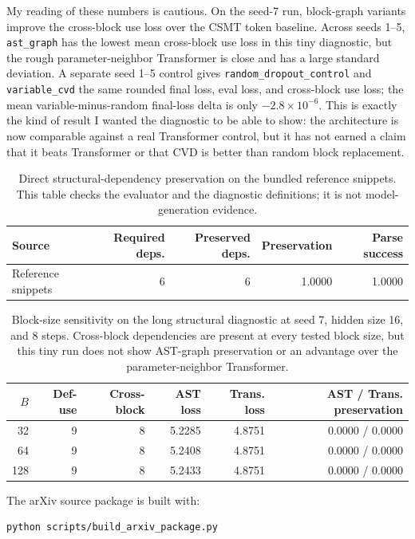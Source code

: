 \documentclass[10pt]{article}
\begin{document}
My reading of these numbers is cautious.  On the seed-7 run, block-graph
variants improve the cross-block use loss over the CSMT token baseline.  Across
seeds 1--5, \texttt{ast\_graph} has the lowest mean cross-block use loss in this
tiny diagnostic, but the rough parameter-neighbor Transformer is close and has a
large standard deviation.  A separate seed 1--5 control gives
\texttt{random\_dropout\_control} and \texttt{variable\_cvd} the same rounded
final loss, eval loss, and cross-block use loss; the mean variable-minus-random
final-loss delta is only $-2.8\times 10^{-6}$.  This is exactly the kind of
result I wanted the diagnostic to be able to show: the architecture is now
comparable against a real Transformer control, but it has not earned a claim
that it beats Transformer or that CVD is better than random block replacement.

\begin{table}[t]
  \centering
  \caption{Direct structural-dependency preservation on the bundled reference
  snippets.  This table checks the evaluator and the diagnostic definitions; it
  is not model-generation evidence.}
  \label{tab:dependency_preservation}
  \small
  \begin{tabular}{lrrrr}
    \toprule
    Source & Required deps. & Preserved deps. & Preservation & Parse success \\
    \midrule
    Reference snippets & 6 & 6 & 1.0000 & 1.0000 \\
    \bottomrule
  \end{tabular}
\end{table}

\begin{table}[t]
  \centering
  \caption{Block-size sensitivity on the long structural diagnostic at seed 7,
  hidden size 16, and 8 steps.  Cross-block dependencies are present at every
  tested block size, but this tiny run does not show AST-graph preservation or
  an advantage over the parameter-neighbor Transformer.}
  \label{tab:block_size_sensitivity}
  \small
  \begin{tabular}{rrrrrr}
    \toprule
    $B$ & Def-use & Cross-block & AST loss & Trans. loss & AST / Trans. preservation \\
    \midrule
    32 & 9 & 8 & 5.2285 & 4.8751 & 0.0000 / 0.0000 \\
    64 & 9 & 8 & 5.2408 & 4.8751 & 0.0000 / 0.0000 \\
    128 & 9 & 8 & 5.2433 & 4.8751 & 0.0000 / 0.0000 \\
    \bottomrule
  \end{tabular}
\end{table}

The arXiv source package is built with:
\begin{verbatim}
python scripts/build_arxiv_package.py
\end{verbatim}
\end{document}

